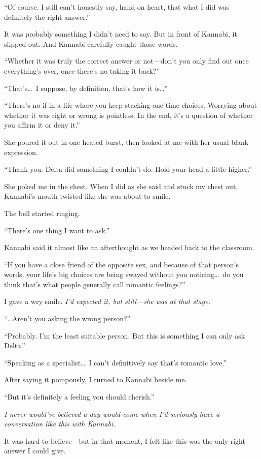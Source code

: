 \documentclass[
    a4paper,
    12pt,
    twoside,
    openany,
    UTF8,
    fontset=windows
]{ctexbook}
\begin{document}
``Of course. I still can't honestly say, hand on heart, that what I did was definitely the right answer.''

It was probably something I didn't need to say. But in front of Kannabi, it slipped out.
And Kannabi carefully caught those words.

``Whether it was truly the correct answer or not---don't you only find out once everything's over, once there's no taking it back?''

``That's\dots\ I suppose, by definition, that's how it is\dots''

``There's no if in a life where you keep stacking one-time choices. Worrying about whether it was right or wrong is pointless. In the end, it's a question of whether you affirm it or deny it.''

She poured it out in one heated burst, then looked at me with her usual blank expression.

``Thank you. Delta did something I couldn't do. Hold your head a little higher.''

She poked me in the chest. When I did as she said and stuck my chest out, Kannabi's mouth twisted like she was about to smile.

The bell started ringing.

``There's one thing I want to ask.''

Kannabi said it almost like an afterthought as we headed back to the classroom.

``If you have a close friend of the opposite sex, and because of that person's words, your life's big choices are being swayed without you noticing\dots\ do you think that's what people generally call romantic feelings?''

I gave a wry smile. \textit{I'd expected it, but still---she was at that stage.}

``\dots Aren't you asking the wrong person?''

``Probably. I'm the least suitable person. But this is something I can only ask Delta.''

``Speaking as a specialist\dots\ I can't definitively say that's romantic love.''

After saying it pompously, I turned to Kannabi beside me.

``But it's definitely a feeling you should cherish.''

\textit{I never would've believed a day would come when I'd seriously have a conversation like this with Kannabi.}

It was hard to believe---but in that moment, I felt like this was the only right answer I could give.
\end{document}
